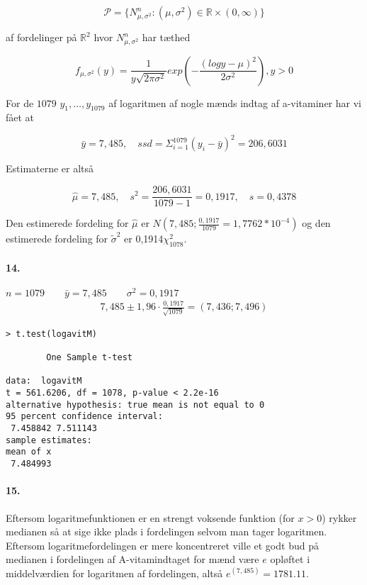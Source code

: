 \begin{equation*}
  \mathcal{P} =\{ N^n_{\mu,\sigma^2} : (\mu, \sigma^2) \in \mathbb{R}
  \times (0, \infty) \}
\end{equation*}

af fordelinger på $\mathbb{R}^2$ hvor $N^n_{\mu, \sigma^2}$ har tæthed

\begin{equation*}
  f_{\mu, \sigma^2}(y) = \frac{1}{y \sqrt{2\pi\sigma^2}} exp ( -
  \frac{(log y - \mu)^2}{2\sigma^2} ), y>0
\end{equation*}

For de $1079$ $y_1, \ldots, y_{1079}$ af logaritmen af nogle mænds
indtag af a-vitaminer har vi fået at

\begin{equation*}
  \bar{y} = 7,485, \quad ssd = \Sigma^{1079}_{i=1}(y_i - \bar{y})^2 =
  206,6031
\end{equation*}

Estimaterne er altså

\begin{equation*}
  \hat{\mu} = 7,485, \quad s^2 = \frac{206,6031}{1079-1} = 0,1917, \quad
  s = 0,4378
\end{equation*}

Den estimerede fordeling for $\hat{\mu}$ er $N(7,485;
\frac{0,1917}{1079} = 1,7762 * 10^{-4})$ og den estimerede fordeling
for $\tilde{\sigma}^2$ er 0,1914$\chi^2_{1078}$.

\paragraph{14.} 
$n = 1079 \qquad \bar{y} = 7,485 \qquad \sigma^2 = 0,1917$
\begin{align*}
7,485 \pm 1,96 \cdot \frac{0,1917}{\sqrt{1079}} = (7,436 ; 7,496)
\end{align*}

\begin{verbatim}
> t.test(logavitM)

        One Sample t-test

data:  logavitM 
t = 561.6206, df = 1078, p-value < 2.2e-16
alternative hypothesis: true mean is not equal to 0 
95 percent confidence interval:
 7.458842 7.511143 
sample estimates:
mean of x 
 7.484993 
\end{verbatim}

\paragraph{15.}

Eftersom logaritmefunktionen er en strengt voksende funktion (for
$x>0$) rykker medianen så at sige ikke plads i fordelingen selvom man
tager logaritmen. Eftersom logaritmefordelingen er mere koncentreret
ville et godt bud på medianen i fordelingen af A-vitamindtaget for
mænd være $e$ opløftet i middelværdien for logaritmen af fordelingen,
altså $e^(7,485) = 1781.11$.

